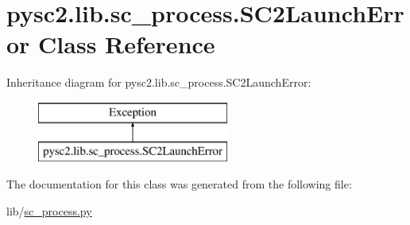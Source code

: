 \hypertarget{classpysc2_1_1lib_1_1sc__process_1_1_s_c2_launch_error}{}\section{pysc2.\+lib.\+sc\+\_\+process.\+S\+C2\+Launch\+Error Class Reference}
\label{classpysc2_1_1lib_1_1sc__process_1_1_s_c2_launch_error}
Inheritance diagram for pysc2.\+lib.\+sc\+\_\+process.\+S\+C2\+Launch\+Error\+:\begin{figure}[H]
\begin{center}
\leavevmode
\includegraphics[height=2.000000cm]{classpysc2_1_1lib_1_1sc__process_1_1_s_c2_launch_error}
\end{center}
\end{figure}


The documentation for this class was generated from the following file\+:\begin{DoxyCompactItemize}
\item 
lib/\mbox{\hyperlink{sc__process_8py}{sc\+\_\+process.\+py}}\end{DoxyCompactItemize}
